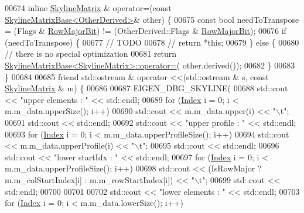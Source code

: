\begin{DoxyCode}
00674             \textcolor{keyword}{inline} \hyperlink{class_eigen_1_1_skyline_matrix}{SkylineMatrix} & operator=(\textcolor{keyword}{const} 
      \hyperlink{class_eigen_1_1_skyline_matrix_base}{SkylineMatrixBase<OtherDerived>}& other) \{
00675         \textcolor{keyword}{const} \textcolor{keywordtype}{bool} needToTranspose = (Flags & \hyperlink{group__flags_gae4f56c2a60bbe4bd2e44c5b19cbe8762}{RowMajorBit}) != (OtherDerived::Flags & 
      \hyperlink{group__flags_gae4f56c2a60bbe4bd2e44c5b19cbe8762}{RowMajorBit});
00676         \textcolor{keywordflow}{if} (needToTranspose) \{
00677             \textcolor{comment}{//         TODO}
00678             \textcolor{comment}{//            return *this;}
00679         \} \textcolor{keywordflow}{else} \{
00680             \textcolor{comment}{// there is no special optimization}
00681             \textcolor{keywordflow}{return} \hyperlink{class_eigen_1_1_skyline_matrix_base}{SkylineMatrixBase<SkylineMatrix>::operator=}(
      other.derived());
00682         \}
00683     \}
00684 
00685     \textcolor{keyword}{friend} std::ostream & operator <<(std::ostream & s, \textcolor{keyword}{const} \hyperlink{class_eigen_1_1_skyline_matrix}{SkylineMatrix} & m) \{
00686 
00687         EIGEN\_DBG\_SKYLINE(
00688         std::cout << \textcolor{stringliteral}{"upper elements : "} << std::endl;
00689         \textcolor{keywordflow}{for} (\hyperlink{group___core___module_a554f30542cc2316add4b1ea0a492ff02}{Index} i = 0; i < m.m\_data.upperSize(); i++)
00690             std::cout << m.m\_data.upper(i) << \textcolor{stringliteral}{"\(\backslash\)t"};
00691         std::cout << std::endl;
00692         std::cout << \textcolor{stringliteral}{"upper profile : "} << std::endl;
00693         \textcolor{keywordflow}{for} (\hyperlink{group___core___module_a554f30542cc2316add4b1ea0a492ff02}{Index} i = 0; i < m.m\_data.upperProfileSize(); i++)
00694             std::cout << m.m\_data.upperProfile(i) << \textcolor{stringliteral}{"\(\backslash\)t"};
00695         std::cout << std::endl;
00696         std::cout << \textcolor{stringliteral}{"lower startIdx : "} << std::endl;
00697         \textcolor{keywordflow}{for} (\hyperlink{group___core___module_a554f30542cc2316add4b1ea0a492ff02}{Index} i = 0; i < m.m\_data.upperProfileSize(); i++)
00698             std::cout << (IsRowMajor ? m.m\_colStartIndex[i] : m.m\_rowStartIndex[i]) << \textcolor{stringliteral}{"\(\backslash\)t"};
00699         std::cout << std::endl;
00700 
00701 
00702         std::cout << \textcolor{stringliteral}{"lower elements : "} << std::endl;
00703         \textcolor{keywordflow}{for} (\hyperlink{group___core___module_a554f30542cc2316add4b1ea0a492ff02}{Index} i = 0; i < m.m\_data.lowerSize(); i++)

\end{DoxyCode}
